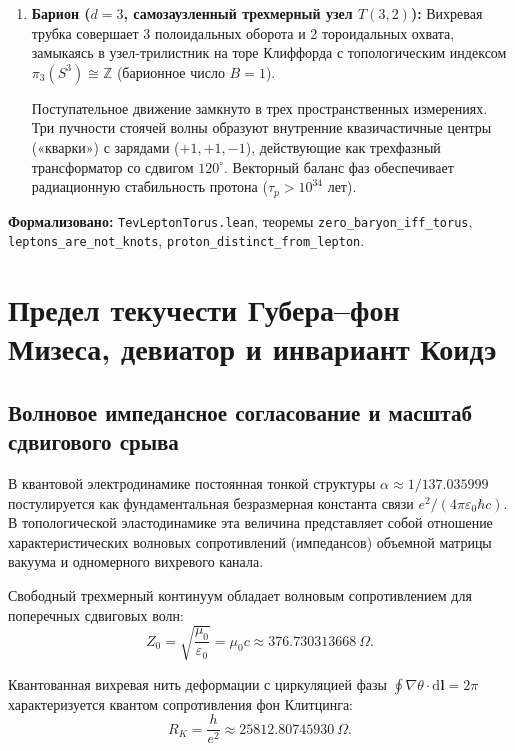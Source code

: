 \documentclass[11pt,a4paper]{article}
\theoremstyle{definition}
\theoremstyle{remark}
\begin{document}
\begin{enumerate}
\item \textbf{Барион ($d = 3$, самозаузленный трехмерный узел $T(3,2)$):}
Вихревая трубка совершает 3 полоидальных оборота и 2 тороидальных охвата, замыкаясь в узел-трилистник на торе Клиффорда с топологическим индексом $\pi_3(S^3) \cong \mathbb{Z}$ (барионное число $B=1$).
		
Поступательное движение замкнуто в трех пространственных измерениях. Три пучности стоячей волны образуют внутренние квазичастичные центры («кварки») с зарядами ($+1, +1, -1$), действующие как трехфазный трансформатор со сдвигом $120^\circ$. Векторный баланс фаз обеспечивает радиационную стабильность протона ($\tau_p > 10^{34}$ лет).
\end{enumerate}
\noindent\small\textbf{Формализовано:} \texttt{TevLeptonTorus.lean}, теоремы \texttt{zero_baryon_iff_torus}, \texttt{leptons_are_not_knots}, \texttt{proton_distinct_from_lepton}.

\section{Предел текучести Губера--фон Мизеса, девиатор и инвариант Коидэ}

\subsection{Волновое импедансное согласование и масштаб сдвигового срыва}

В квантовой электродинамике постоянная тонкой структуры $\alpha \approx 1/137.035999$ постулируется как фундаментальная безразмерная константа связи $e^2 / (4\pi \varepsilon_0 \hbar c)$. В топологической эластодинамике эта величина представляет собой отношение характеристических волновых сопротивлений (импедансов) объемной матрицы вакуума и одномерного вихревого канала.

Свободный трехмерный континуум обладает волновым сопротивлением для поперечных сдвиговых волн:
\begin{equation}
Z_0 = \sqrt{\frac{\mu_0}{\varepsilon_0}} = \mu_0 c \approx 376.730313668\ \Omega.
\label{eq:wave_impedance_z0}
\end{equation}

Квантованная вихревая нить деформации с циркуляцией фазы $\oint \nabla\theta \cdot \mathrm{d}\mathbf{l} = 2\pi$ характеризуется квантом сопротивления фон Клитцинга:
\begin{equation}
R_K = \frac{h}{e^2} \approx 25812.80745930\ \Omega.
\label{eq:klitzing_rk_def}
\end{equation}
\end{document}
